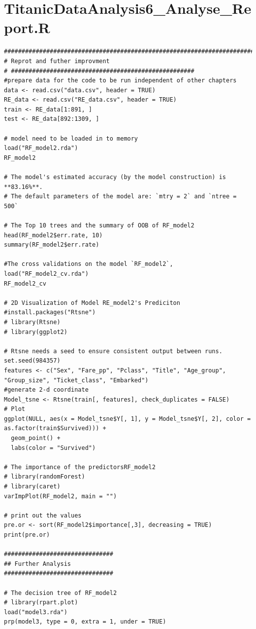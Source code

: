 \documentclass[
]{book}
\begin{document}
\hypertarget{titanicdataanalysis6_analyse_report.r}{%
\section*{TitanicDataAnalysis6\_Analyse\_Report.R}\label{titanicdataanalysis6_analyse_report.r}}


\begin{verbatim}
##########################################################################
# Reprot and futher improvment
# ####################################################
#prepare data for the code to be run independent of other chapters
data <- read.csv("data.csv", header = TRUE)
RE_data <- read.csv("RE_data.csv", header = TRUE)
train <- RE_data[1:891, ]
test <- RE_data[892:1309, ]

# model need to be loaded in to memory
load("RF_model2.rda")
RF_model2

# The model's estimated accuracy (by the model construction) is **83.16%**.
# The default parameters of the model are: `mtry = 2` and `ntree = 500`

# The Top 10 trees and the summary of OOB of RF_model2
head(RF_model2$err.rate, 10)
summary(RF_model2$err.rate)

#The cross validations on the model `RF_model2`,
load("RF_model2_cv.rda")
RF_model2_cv

# 2D Visualization of Model RE_model2's Prediciton
#install.packages("Rtsne")
# library(Rtsne)
# library(ggplot2)

# Rtsne needs a seed to ensure consistent output between runs.
set.seed(984357)
features <- c("Sex", "Fare_pp", "Pclass", "Title", "Age_group", "Group_size", "Ticket_class", "Embarked")
#generate 2-d coordinate
Model_tsne <- Rtsne(train[, features], check_duplicates = FALSE)
# Plot
ggplot(NULL, aes(x = Model_tsne$Y[, 1], y = Model_tsne$Y[, 2], color = as.factor(train$Survived))) +
  geom_point() +
  labs(color = "Survived")

# The importance of the predictorsRF_model2
# library(randomForest)
# library(caret)
varImpPlot(RF_model2, main = "")

# print out the values
pre.or <- sort(RF_model2$importance[,3], decreasing = TRUE)
print(pre.or)

###############################
## Further Analysis
###############################

# The decision tree of RF_model2
# library(rpart.plot)
load("model3.rda")
prp(model3, type = 0, extra = 1, under = TRUE)



\end{verbatim}
\end{document}
